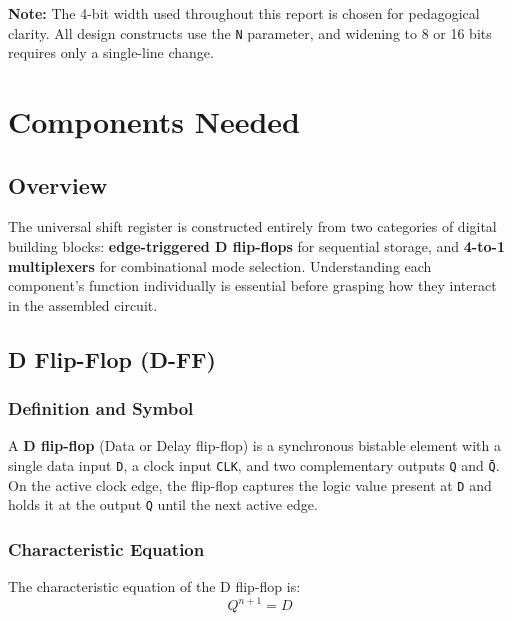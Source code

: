 \documentclass[12pt,a4paper]{report}
\newcommand{\signal}[1]{\texttt{\textcolor{codeblue}{#1}}}
\begin{document}
\begin{notebox}
\textbf{Note:} The 4-bit width used throughout this report is chosen for pedagogical clarity. All design constructs use the \texttt{N} parameter, and widening to 8 or 16 bits requires only a single-line change.
\end{notebox}

\chapter{Components Needed}

\section{Overview}

The universal shift register is constructed entirely from two categories of digital building blocks: \textbf{edge-triggered D flip-flops} for sequential storage, and \textbf{4-to-1 multiplexers} for combinational mode selection. Understanding each component's function individually is essential before grasping how they interact in the assembled circuit.

\section{D Flip-Flop (D-FF)}

\subsection{Definition and Symbol}

A \textbf{D flip-flop} (Data or Delay flip-flop) is a synchronous bistable element with a single data input \signal{D}, a clock input \signal{CLK}, and two complementary outputs \signal{Q} and \signal{\={Q}}. On the active clock edge, the flip-flop captures the logic value present at \signal{D} and holds it at the output \signal{Q} until the next active edge.

\subsection{Characteristic Equation}

The characteristic equation of the D flip-flop is:
\begin{equation}
    Q^{n+1} = D
    \label{eq:dff}
\end{equation}
\end{document}
